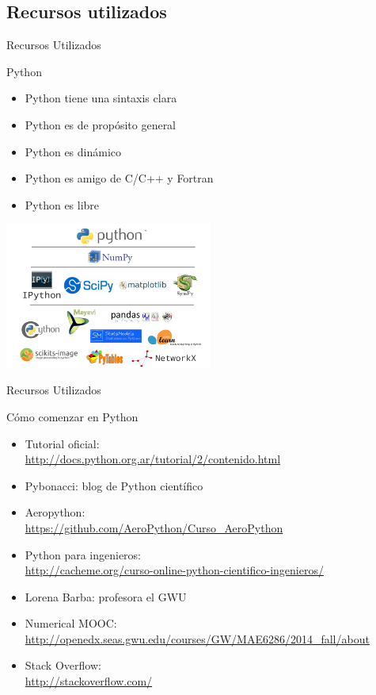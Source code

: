 \documentclass [8pt] {beamer}
\begin{document}
    \subsection{Recursos utilizados}
        \begin{frame}{Recursos Utilizados}
            \begin{block}{Python}
                \begin{itemize}
                    \item Python tiene una sintaxis clara
                    \item Python es de propósito general
                    \item Python es dinámico
                    \item Python es amigo de C/C++ y Fortran
                    \item Python es libre 
                \end{itemize}
                \begin{center}
                    \includegraphics[height=4.8cm]{pythoneco.png}
                \end{center}
            \end{block}
        \end{frame}
        \begin{frame}{Recursos Utilizados}
            \begin{block}{Cómo comenzar en Python}
                \begin{itemize}
                    \item Tutorial oficial: \\ \url {http://docs.python.org.ar/tutorial/2/contenido.html}
                    \item Pybonacci: blog de Python científico
                    \item Aeropython: \\ \url {https://github.com/AeroPython/Curso_AeroPython}
                    \item Python para ingenieros: \\ \url {http://cacheme.org/curso-online-python-cientifico-ingenieros/}
                    \item Lorena Barba: profesora el GWU    
                    \item Numerical MOOC: \\  \url {http://openedx.seas.gwu.edu/courses/GW/MAE6286/2014_fall/about}
                    \item Stack Overflow: \\ \url {http://stackoverflow.com/}
                \end{itemize}
            \end{block}
        \end{frame}
\end{document}
